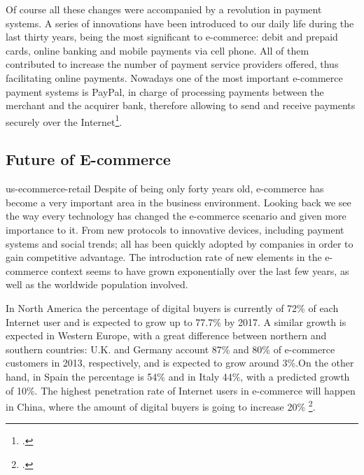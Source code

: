 Of course all these changes were accompanied by a revolution in payment systems. A series of innovations have been introduced to our daily life during the last thirty years, being the most significant to e-commerce: debit and prepaid cards, online banking and mobile payments via cell phone. All of them contributed to increase the number of payment service providers offered, thus facilitating online payments. Nowadays one of the most important e-commerce payment systems is PayPal, in charge of processing payments between the merchant and the acquirer bank, therefore allowing to send and receive payments securely over the Internet\footcite{KRSS12}.

  
\subsection{Future of E-commerce} us-ecommerce-retail
Despite of being only forty years old, e-commerce has become a very important area in the business environment. Looking back we see the way every technology has changed the e-commerce scenario and given more importance to it. From new protocols to innovative devices, including payment systems and social trends; all has been quickly adopted by companies in order to gain competitive advantage. The introduction rate of new elements in the e-commerce context seems to have grown exponentially over the last few years, as well as the worldwide population involved.

In North America the percentage of digital buyers is currently of 72\% of each Internet user and is expected to grow up to 77.7\% by 2017. A similar growth is expected in Western Europe, with a great difference between northern and southern countries: U.K. and Germany account 87\% and 80\% of e-commerce customers in 2013, respectively, and is expected to grow around 3\%.On the other hand, in Spain the percentage is 54\% and in Italy 44\%, with a predicted growth of 10\%. The highest penetration rate of Internet users in e-commerce will happen in China, where the amount of digital buyers is going to increase 20\% \footcite{eMa613}.


